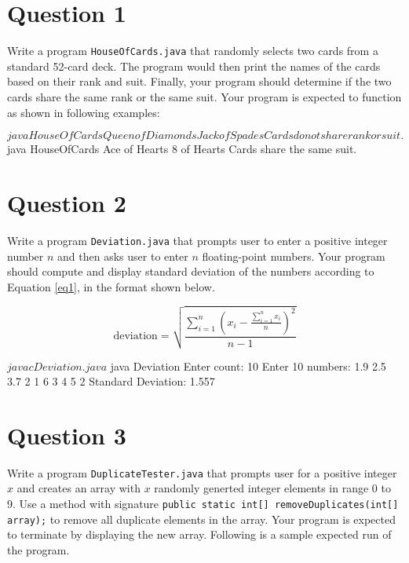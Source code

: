 \documentclass[12pt,letterpaper,twoside]{article}
\begin{document}


\section*{Question 1}

Write a program \texttt{HouseOfCards.java} that randomly selects two cards from a standard 52-card deck.
The program would then print the names of the cards based on their rank and suit.
Finally, your program should determine if the two cards share the same rank or the same suit.
Your program is expected to function as shown in following examples:

\begin{terminal}
$ java HouseOfCards
Queen of Diamonds
Jack of Spades
Cards do not share rank or suit.
$ java HouseOfCards
Ace of Hearts
8 of Hearts
Cards share the same suit.
\end{terminal}

\newpage

\section*{Question 2}

Write a program \texttt{Deviation.java} that prompts user to enter a positive integer number $n$ and then asks user to enter $n$ floating-point numbers.
Your program should compute and display standard deviation of the numbers according to Equation \ref{eq1}, in the format shown below.

\begin{equation}
\text{deviation} = \sqrt{\frac{\sum_{i = 1}^{n} \left( x_i - \frac{\sum_{i = 1}^{n} x_i}{n} \right)^2 }{n - 1}}
\label{eq1}
\end{equation}

\begin{terminal}
$ javac Deviation.java
$ java Deviation
Enter count: 10
Enter 10 numbers: 1.9 2.5 3.7 2 1 6 3 4 5 2
Standard Deviation: 1.557
\end{terminal}

\section*{Question 3}

Write a program \texttt{DuplicateTester.java} that prompts user for a positive integer $x$ and creates an array with $x$ randomly generted integer elements in range 0 to 9.
Use a method with signature \texttt{public static int[] removeDuplicates(int[] array);} to remove all duplicate elements in the array.
Your program is expected to terminate by displaying the new array.
Following is a sample expected run of the program.
\end{document}
